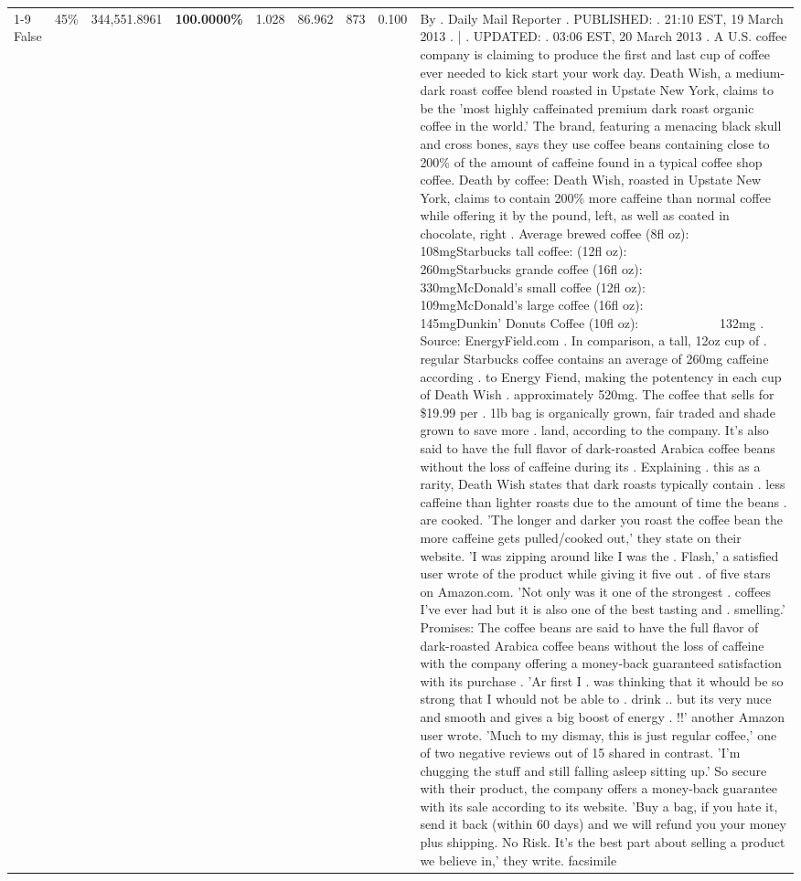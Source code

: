 \begin{table}[H]
{\begin{tabular}{lllrlllll}
\cline{1-9} \cline{2-9}
False & 45\% & 344,551.8961 & \bfseries \color{red} 100.0000\% & 1.028 & 86.962 & 873 & 0.100 & By . Daily Mail Reporter . PUBLISHED: . 21:10 EST, 19 March 2013 . | . UPDATED: . 03:06 EST, 20 March 2013 . A U.S. coffee company is claiming to produce the first and last cup of coffee ever needed to kick start your work day. Death Wish, a medium-dark roast coffee blend roasted in Upstate New York, claims to be the 'most highly caffeinated premium dark roast organic coffee in the world.' The brand, featuring a menacing black skull and cross bones, says they use coffee beans containing close to 200\% of the amount of caffeine found in a typical coffee shop coffee. Death by coffee: Death Wish, roasted in Upstate New York, claims to contain 200\% more caffeine than normal coffee while offering it by the pound, left, as well as coated in chocolate, right . Average brewed coffee (8fl oz):              108mgStarbucks tall coffee: (12fl oz):                260mgStarbucks grande coffee (16fl oz):         330mgMcDonald's small coffee (12fl oz):           109mgMcDonald's large coffee (16fl oz):           145mgDunkin' Donuts Coffee (10fl oz):             132mg . Source: EnergyField.com . In comparison, a tall, 12oz cup of . regular Starbucks coffee contains an average of 260mg caffeine according . to Energy Fiend, making the potentency in each cup of Death Wish . approximately 520mg. The coffee that sells for \$19.99 per . 1lb bag is organically grown, fair traded and shade grown to save more . land, according to the company. It's also said to have the full flavor of dark-roasted Arabica coffee beans without the loss of caffeine during its . Explaining . this as a rarity, Death Wish states that dark roasts typically contain . less caffeine than lighter roasts due to the amount of time the beans . are cooked. 'The longer and darker you roast the coffee bean the more caffeine gets pulled/cooked out,' they state on their website. 'I was zipping around like I was the . Flash,' a satisfied user wrote of the product while giving it five out . of five stars on Amazon.com. 'Not only was it one of the strongest . coffees I've ever had but it is also one of the best tasting and . smelling.’ Promises: The coffee beans are said to have the full flavor of dark-roasted Arabica coffee beans without the loss of caffeine with the company offering a money-back guaranteed satisfaction with its purchase . 'Ar first I . was thinking that it whould be so strong that I whould not be able to . drink .. but its very nuce and smooth and gives a big boost of energy . !!' another Amazon user wrote. 'Much to my dismay, this is just regular coffee,' one of two negative reviews out of 15 shared in contrast. 'I'm chugging the stuff and still falling asleep sitting up.' So secure with their product, the company offers a money-back guarantee with its sale according to its website. 'Buy a bag, if you hate it, send it back (within 60 days) and we will refund you your money plus shipping. No Risk. It’s the best part about selling a product we believe in,' they write. facsimile \\

\end{tabular}}
\end{table}
